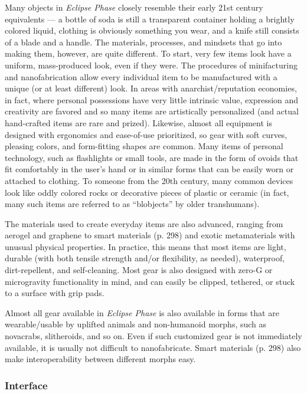 Many objects in \emph{Eclipse Phase} closely resemble their early 21st century equivalents --- a bottle of soda is still a transparent container holding a brightly colored liquid, clothing is obviously something you wear, and a knife still consists of a blade and a handle. The materials, processes, and mindsets that go into making them, however, are quite different. To start, very few items look have a uniform, mass-produced look, even if they were. The procedures of minifacturing and nanofabrication allow every individual item to be manufactured with a unique (or at least different) look. In areas with anarchist/reputation economies, in fact, where personal possessions have very little intrinsic value, expression and creativity are favored and so many items are artistically personalized (and actual hand-crafted items are rare and prized). Likewise, almost all equipment is designed with ergonomics and ease-of-use prioritized, so gear with soft curves, pleasing colors, and form-fitting shapes are common. Many items of personal technology, such as flashlights or small tools, are made in the form of ovoids that fit comfortably in the user’s hand or in similar forms that can be easily worn or attached to clothing. To someone from the 20th century, many common devices look like oddly colored rocks or decorative pieces of plastic or ceramic (in fact, many such items are referred to as ``blobjects'' by older transhumans). 

The materials used to create everyday items are also advanced, ranging from aerogel and graphene to smart materials (p. 298) and exotic metamaterials with unusual physical properties. In practice, this means that most items are light, durable (with both tensile strength and/or flexibility, as needed), waterproof, dirt-repellent, and self-cleaning. Most gear is also designed with zero-G or microgravity functionality in mind, and can easily be clipped, tethered, or stuck to a surface with grip pads. 

Almost all gear available in \emph{Eclipse Phase} is also available in forms that are wearable/usable by uplifted animals and non-humanoid morphs, such as novacrabs, slitheroids, and so on. Even if such customized gear is not immediately available, it is usually not difficult to nanofabricate. Smart materials (p. 298) also make interoperability between different morphs easy. 

\subsubsection{Interface} 

